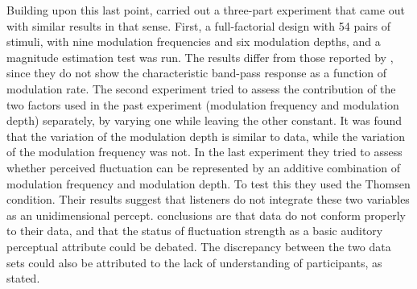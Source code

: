 \documentclass[../main.tex]{subfiles}
\begin{document}
\begin{theoreticalbackground}
Building upon this last point, \citeauthor{Wickelmaier2004Scaling} carried out
a three-part experiment that came out with similar results in that sense. First,
a full-factorial design with 54 pairs of stimuli, with nine modulation
frequencies and six modulation depths, and a magnitude estimation test was run.
The results differ from those reported by \citeauthor{Fastl2007Psychoacoustics},
since they do not show the characteristic band-pass response as a function of
modulation rate. The second experiment tried to assess the contribution of the
two factors used in the past experiment (modulation frequency and modulation
depth) separately, by varying one while leaving the other constant. It was found
that the variation of the modulation depth is similar to
\citeauthor{Fastl2007Psychoacoustics} data, while the variation of the
modulation frequency was not. In the last experiment they tried to assess
whether perceived fluctuation can be represented by an additive combination of
modulation frequency and modulation depth. To test this they used the Thomsen
condition. Their results suggest that listeners do not integrate these two
variables as an unidimensional percept. \citeauthor{Wickelmaier2004Scaling}
conclusions are that \citeauthor{Fastl2007Psychoacoustics} data do not conform
properly to their data, and that the status of fluctuation strength as a basic
auditory perceptual attribute could be debated. The discrepancy between the two
data sets could also be attributed to the lack of understanding of participants,
as \citeauthor{Accolti2009Fluctuation} stated.

\end{theoreticalbackground}
\end{document}
